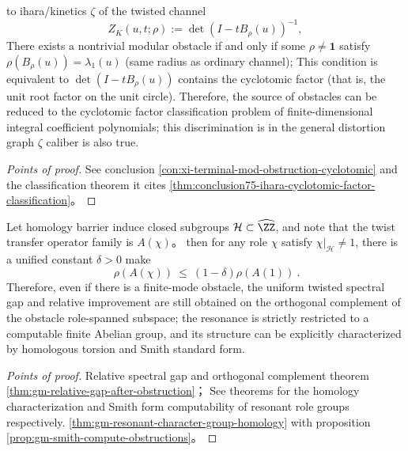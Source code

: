 \begin{conclusion}\label{con:xi-mod-obstruction-cyclotomic-factor}
to ihara/kinetics \(\zeta\) of the twisted channel
\[
Z_K(u,t;\rho):=\det(I-tB_\rho(u))^{-1},
\]
There exists a nontrivial modular obstacle if and only if some \(\rho\neq \mathbf{1}\) satisfy \(\rho(B_\rho(u))=\lambda_1(u)\) (same radius as ordinary channel);
This condition is equivalent to \(\det(I-tB_\rho(u))\) contains the cyclotomic factor (that is, the unit root factor on the unit circle).
Therefore, the source of obstacles can be reduced to the cyclotomic factor classification problem of finite-dimensional integral coefficient polynomials; this discrimination is in the general distortion graph \(\zeta\) caliber is also true.
\end{conclusion}
\begin{proof}[Points of proof]
See conclusion \ref{con:xi-terminal-mod-obstruction-cyclotomic} and the classification theorem it cites \ref{thm:conclusion75-ihara-cyclotomic-factor-classification}。
\end{proof}

\begin{conclusion}\label{con:xi-relative-gap-after-obstruction-finite-resonant-subspace}
Let homology barrier induce closed subgroups \(\mathcal{H}\subset\widehat{\ZZ}\), and note that the twist transfer operator family is \(A(\chi)\)。
then for any role \(\chi\) satisfy \(\chi|_{\mathcal{H}}\neq 1\), there is a unified constant \(\delta>0\) make
\[
\boxed{\ \rho(A(\chi))\ \le\ (1-\delta)\rho(A(1))\ }.
\]
Therefore, even if there is a finite-mode obstacle, the uniform twisted spectral gap and relative improvement are still obtained on the orthogonal complement of the obstacle role-spanned subspace; the resonance is strictly restricted to a computable finite Abelian group, and its structure can be explicitly characterized by homologous torsion and Smith standard form.
\end{conclusion}
\begin{proof}[Points of proof]
Relative spectral gap and orthogonal complement theorem \ref{thm:gm-relative-gap-after-obstruction}；
See theorems for the homology characterization and Smith form computability of resonant role groups respectively. \ref{thm:gm-resonant-character-group-homology} with proposition \ref{prop:gm-smith-compute-obstructions}。
\end{proof}

